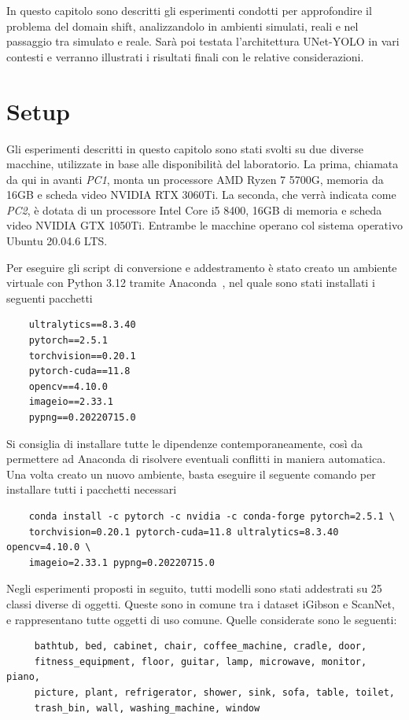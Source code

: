 \documentclass[12pt]{report}
\begin{document}
In questo capitolo sono descritti gli esperimenti condotti per approfondire il problema del domain shift, analizzandolo in ambienti simulati, reali e nel passaggio tra simulato e reale. Sarà poi testata l'architettura UNet-YOLO in vari contesti e verranno illustrati i risultati finali con le relative considerazioni.

\section{Setup}
\label{sec:setup}

Gli esperimenti descritti in questo capitolo sono stati svolti su due diverse macchine, utilizzate in base alle disponibilità del laboratorio. La prima, chiamata da qui in avanti \textit{PC1}, monta un processore AMD Ryzen 7 5700G, memoria da 16GB e scheda video NVIDIA RTX 3060Ti. La seconda, che verrà indicata come \textit{PC2}, è dotata di un processore Intel Core i5 8400, 16GB di memoria e scheda video NVIDIA GTX 1050Ti. Entrambe le macchine operano col sistema operativo Ubuntu 20.04.6 LTS.

Per eseguire gli script di conversione e addestramento è stato creato un ambiente virtuale con Python 3.12 tramite Anaconda~\cite{anaconda}, nel quale sono stati installati i seguenti pacchetti

\begin{verbatim}
	ultralytics==8.3.40
	pytorch==2.5.1
	torchvision==0.20.1
	pytorch-cuda==11.8
	opencv==4.10.0
	imageio==2.33.1
	pypng==0.20220715.0
\end{verbatim}

Si consiglia di installare tutte le dipendenze contemporaneamente, così da permettere ad Anaconda di risolvere eventuali conflitti in maniera automatica. Una volta creato un nuovo ambiente, basta eseguire il seguente comando per installare tutti i pacchetti necessari

\begin{verbatim}
	conda install -c pytorch -c nvidia -c conda-forge pytorch=2.5.1 \
	torchvision=0.20.1 pytorch-cuda=11.8 ultralytics=8.3.40 opencv=4.10.0 \
	imageio=2.33.1 pypng=0.20220715.0
\end{verbatim}

Negli esperimenti proposti in seguito, tutti modelli sono stati addestrati su 25 classi diverse di oggetti. Queste sono in comune tra i dataset iGibson e ScanNet, e rappresentano tutte oggetti di uso comune. Quelle considerate sono le seguenti:

\begin{verbatim}
	 bathtub, bed, cabinet, chair, coffee_machine, cradle, door,
	 fitness_equipment, floor, guitar, lamp, microwave, monitor, piano,
	 picture, plant, refrigerator, shower, sink, sofa, table, toilet,
	 trash_bin, wall, washing_machine, window
	
\end{verbatim}
\end{document}
